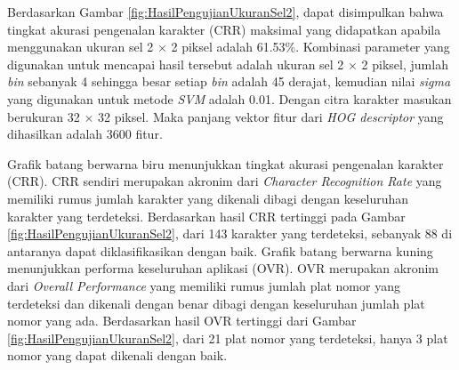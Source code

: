 \begin{adjustbox}{width=1\textwidth}
	\noindent\begin{minipage}{\linewidth}
		\centering{}
		\label{fig:HasilPengujianUkuranSel2}
	\end{minipage}
\end{adjustbox}

\noindent Berdasarkan Gambar \ref{fig:HasilPengujianUkuranSel2}, dapat disimpulkan bahwa tingkat akurasi pengenalan karakter (CRR) maksimal yang didapatkan apabila menggunakan ukuran sel 2 $\times$ 2 piksel adalah 61.53\%. Kombinasi parameter yang digunakan untuk mencapai hasil tersebut adalah ukuran sel 2 $\times$ 2 piksel, jumlah \textit{bin} sebanyak 4 sehingga besar setiap \textit{bin} adalah 45 derajat, kemudian nilai \textit{sigma} yang digunakan untuk metode \textit{SVM} adalah 0.01. Dengan citra karakter masukan berukuran 32 $\times$ 32 piksel. Maka panjang vektor fitur dari \textit{HOG descriptor} yang dihasilkan adalah 3600 fitur.

\noindent Grafik batang berwarna biru menunjukkan tingkat akurasi pengenalan karakter (CRR). CRR sendiri merupakan akronim dari \textit{Character Recognition Rate} yang memiliki rumus jumlah karakter yang dikenali dibagi dengan keseluruhan karakter yang terdeteksi. Berdasarkan hasil CRR tertinggi pada Gambar \ref{fig:HasilPengujianUkuranSel2}, dari 143 karakter yang terdeteksi, sebanyak 88 di antaranya dapat diklasifikasikan dengan baik. Grafik batang berwarna kuning menunjukkan performa keseluruhan aplikasi (OVR). OVR merupakan akronim dari \textit{Overall Performance} yang memiliki rumus jumlah plat nomor yang terdeteksi dan dikenali dengan benar dibagi dengan keseluruhan jumlah plat nomor yang ada. Berdasarkan hasil OVR tertinggi dari Gambar \ref{fig:HasilPengujianUkuranSel2}, dari 21 plat nomor yang terdeteksi, hanya 3 plat nomor yang dapat dikenali dengan baik. 

